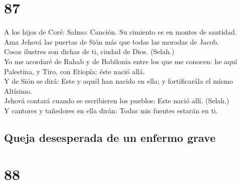 \hypertarget{section-19-87}{%
\section{87}\label{section-19-87}}

 A los hijos de Coré: Salmo: Canción. Su cimiento es en
montes de santidad.\\
 Ama Jehová las puertas de Sión más que todas las moradas
de Jacob.\\
 Cosas ilustres son dichas de ti, ciudad de Dios.
(Selah.)\\
 Yo me acordaré de Rahab y de Babilonia entre los que me
conocen: he aquí Palestina, y Tiro, con Etiopía: éste nació allá.\\
 Y de Sión se dirá: Este y aquél han nacido en ella; y
fortificarála el mismo Altísimo.\\
 Jehová contará cuando se escribieren los pueblos: Este
nació allí. (Selah.)\\
 Y cantores y tañedores en ella dirán: Todas mis fuentes
estarán en ti.

\hypertarget{queja-desesperada-de-un-enfermo-grave}{%
\subsection{Queja desesperada de un enfermo
grave}\label{queja-desesperada-de-un-enfermo-grave}}

\hypertarget{section-19-88}{%
\section{88}\label{section-19-88}}

